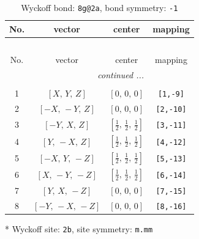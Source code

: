 \documentclass[fleqn,8pt]{jsarticle}
\begin{document}
\renewcommand{\arraystretch}{1.2}
\begin{longtable}{cccc}
\caption{Wyckoff bond: {\tt 8g@2a}, bond symmetry: {\tt -1}}
 \\
 \hline \hline
No. & vector & center & mapping \\ \hline \endfirsthead

\multicolumn{3}{l}{\tablename\ \thetable{}} \\
 \hline \hline
No. & vector & center & mapping \\ \hline \endhead

 \hline \hline
\multicolumn{3}{r}{\footnotesize\it continued ...} \\ \endfoot

 \hline \hline
\multicolumn{3}{r}{} \\ \endlastfoot

1 & $\left[ X,\, Y,\, Z \right]$ & $\left[ 0,\, 0,\, 0 \right]$ & {\tt [1,-9]} \\ \hline
2 & $\left[ - X,\, - Y,\, Z \right]$ & $\left[ 0,\, 0,\, 0 \right]$ & {\tt [2,-10]} \\ \hline
3 & $\left[ - Y,\, X,\, Z \right]$ & $\left[ \frac{1}{2},\, \frac{1}{2},\, \frac{1}{2} \right]$ & {\tt [3,-11]} \\ \hline
4 & $\left[ Y,\, - X,\, Z \right]$ & $\left[ \frac{1}{2},\, \frac{1}{2},\, \frac{1}{2} \right]$ & {\tt [4,-12]} \\ \hline
5 & $\left[ - X,\, Y,\, - Z \right]$ & $\left[ \frac{1}{2},\, \frac{1}{2},\, \frac{1}{2} \right]$ & {\tt [5,-13]} \\ \hline
6 & $\left[ X,\, - Y,\, - Z \right]$ & $\left[ \frac{1}{2},\, \frac{1}{2},\, \frac{1}{2} \right]$ & {\tt [6,-14]} \\ \hline
7 & $\left[ Y,\, X,\, - Z \right]$ & $\left[ 0,\, 0,\, 0 \right]$ & {\tt [7,-15]} \\ \hline
8 & $\left[ - Y,\, - X,\, - Z \right]$ & $\left[ 0,\, 0,\, 0 \right]$ & {\tt [8,-16]} \\
\end{longtable}
* Wyckoff site: {\tt 2b}, site symmetry: {\tt m.mm}
\renewcommand{\arraystretch}{1.2}
\end{document}
